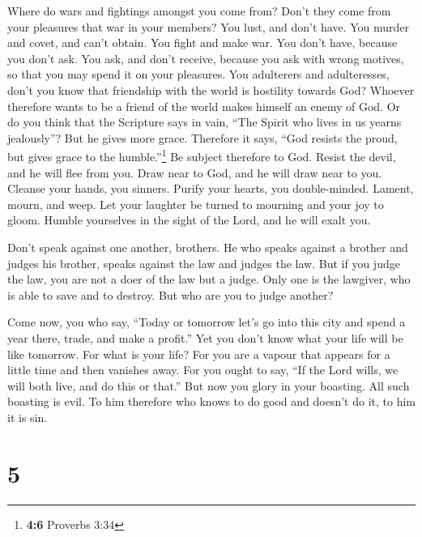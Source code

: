  Where do wars and fightings amongst you come from? Don't
they come from your pleasures that war in your members? 
You lust, and don't have. You murder and covet, and can't obtain. You
fight and make war. You don't have, because you don't ask.
 You ask, and don't receive, because you ask with wrong
motives, so that you may spend it on your pleasures.  You
adulterers and adulteresses, don't you know that friendship with the
world is hostility towards God? Whoever therefore wants to be a friend
of the world makes himself an enemy of God.  Or do you
think that the Scripture says in vain, ``The Spirit who lives in us
yearns jealously''?  But he gives more grace. Therefore it
says, ``God resists the proud, but gives grace to the
humble.''\footnote{\textbf{4:6} Proverbs 3:34}  Be subject
therefore to God. Resist the devil, and he will flee from you.
 Draw near to God, and he will draw near to you. Cleanse
your hands, you sinners. Purify your hearts, you double-minded.
 Lament, mourn, and weep. Let your laughter be turned to
mourning and your joy to gloom.  Humble yourselves in the
sight of the Lord, and he will exalt you.

 Don't speak against one another, brothers. He who speaks
against a brother and judges his brother, speaks against the law and
judges the law. But if you judge the law, you are not a doer of the law
but a judge.  Only one is the lawgiver, who is able to
save and to destroy. But who are you to judge another?

 Come now, you who say, ``Today or tomorrow let's go into
this city and spend a year there, trade, and make a profit.''
 Yet you don't know what your life will be like tomorrow.
For what is your life? For you are a vapour that appears for a little
time and then vanishes away.  For you ought to say, ``If
the Lord wills, we will both live, and do this or that.''
 But now you glory in your boasting. All such boasting is
evil.  To him therefore who knows to do good and doesn't
do it, to him it is sin.

\hypertarget{section-4}{%
\section{5}\label{section-4}}

